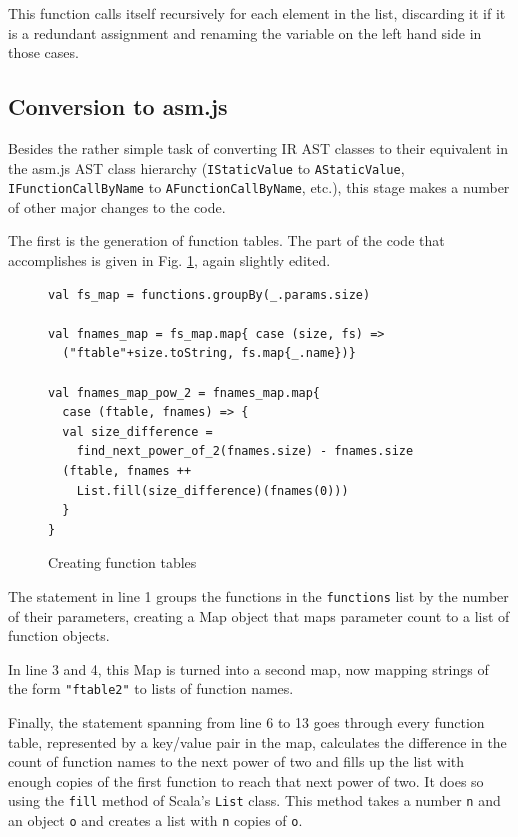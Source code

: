 \documentclass[11pt]{report}
\begin{document}
This function calls itself recursively for each element in the list, discarding it if it is a redundant assignment and renaming the variable on the left hand side in those cases.

\subsection{Conversion to asm.js}
Besides the rather simple task of converting IR AST classes to their equivalent in the asm.js AST class hierarchy (\texttt{IStaticValue} to \texttt{AStaticValue}, \texttt{IFunctionCallByName} to \texttt{AFunctionCallByName}, etc.), this stage makes a number of other major changes to the code.

The first is the generation of function tables. The part of the code that accomplishes is given in Fig. \ref{iconvasmjs1}, again slightly edited.

\begin{figure}[ht]
\begin{lstlisting}
val fs_map = functions.groupBy(_.params.size)

val fnames_map = fs_map.map{ case (size, fs) => 
  ("ftable"+size.toString, fs.map{_.name})}
  
val fnames_map_pow_2 = fnames_map.map{ 
  case (ftable, fnames) => {
  val size_difference = 
    find_next_power_of_2(fnames.size) - fnames.size
  (ftable, fnames ++ 
    List.fill(size_difference)(fnames(0)))
  }
}
\end{lstlisting}
\caption{Creating function tables}
\label{iconvasmjs1}
\end{figure}

The statement in line 1 groups the functions in the \texttt{functions} list by the number of their parameters, creating a Map object that maps parameter count to a list of function objects.

In line 3 and 4, this Map is turned into a second map, now mapping strings of the form \texttt{"ftable2"} to lists of function names.

Finally, the statement spanning from line 6 to 13 goes through every function table, represented by a key/value pair in the map, calculates the difference in the count of function names to the next power of two and fills up the list with enough copies of the first function to reach that next power of two. It does so using the \texttt{fill} method of Scala's \texttt{List} class. This method takes a number \texttt{n} and an object \texttt{o} and creates a list with \texttt{n} copies of \texttt{o}.
\end{document}
